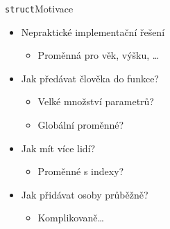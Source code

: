 \begin{frame}{\texttt{struct}}{Motivace}

  \begin{itemize}
    \item Nepraktické implementační řešení
    \begin{itemize}
      \item Proměnná pro věk, výšku, \dots
    \end{itemize}

    \pause

    \item Jak předávat člověka do funkce?
    \begin{itemize}
      \item Velké množství parametrů?
      \item Globální proměnné?
    \end{itemize}

    \pause

    \item Jak mít více lidí?
    \begin{itemize}
      \item Proměnné s indexy?
    \end{itemize}

    \pause

    \item Jak přidávat osoby průběžně?
    \begin{itemize}
      \item Komplikovaně\dots
    \end{itemize}

  \end{itemize}

\end{frame}

